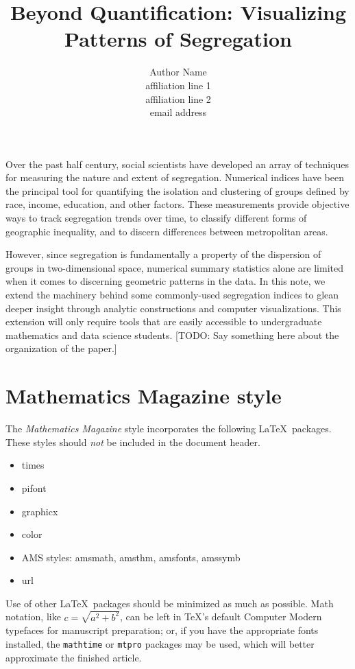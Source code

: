 \documentclass{article}
\theoremstyle{theorem}
\theoremstyle{definition}
\begin{document}
\title{Beyond Quantification: Visualizing Patterns of Segregation}

\author{Author Name\\               %
\scriptsize affiliation line 1\\    %
affiliation line 2\\                %
email address}                      %

\maketitle

\noindent Over the past half century, social scientists have developed an array of techniques for measuring the nature and extent of segregation. \cite{example1} Numerical indices have been the principal tool for quantifying the isolation and clustering of groups defined by race, income, education, and other factors. These measurements provide objective ways to track segregation trends over time, to classify different forms of geographic inequality, and to discern differences between metropolitan areas.

However, since segregation is fundamentally a property of the dispersion of groups in two-dimensional space, numerical summary statistics alone are limited when it comes to discerning geometric patterns in the data. In this note, we extend the machinery behind some commonly-used segregation indices to glean deeper insight through analytic constructions and computer visualizations. This extension will only require tools that are easily accessible to undergraduate mathematics and data science students.  [TODO: Say something here about the organization of the paper.]


\section{Mathematics Magazine style}

The \textit{Mathematics Magazine} style incorporates the following \LaTeX\ packages.  These styles should \textit{not} be included in the document header.
\begin{itemize}
\item times
\item pifont
\item graphicx
\item color
\item AMS styles: amsmath, amsthm, amsfonts, amssymb
\item url
\end{itemize}
Use of other \LaTeX\ packages should be minimized as much as possible. Math notation, like $c = \sqrt{a^2 +b^2}$, can be left in \TeX's default Computer Modern typefaces for manuscript preparation; or, if you have the appropriate fonts installed, the \texttt{mathtime} or \texttt{mtpro} packages may be used, which will better approximate the finished article.
\end{document}
